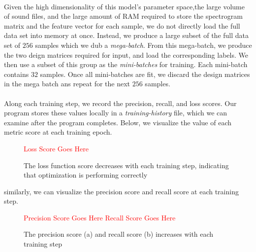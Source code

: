 \documentclass[12pt,letterpaper]{article}
\begin{document}
\paragraph*{}Given the high dimensionality of this model's parameter space,the large volume of sound files, and the large amount of RAM required to store the spectrogram matrix and the feature vector for each sample, we do not directly load the full data set into memory at once. Instead, we produce a large subset of the full data set of $256$ samples which we dub a \textit{mega-batch}. From this mega-batch, we produce the two deign matrices required for input, and load the corresponding labels. We then use a subset of this group as the \textit{mini-batches} for training. Each mini-batch contains $32$ samples. Once all mini-batches are fit, we discard the design matrices in the mega batch ans repeat for the next $256$ samples. 

\paragraph*{}Along each training step, we record the precision, recall, and loss scores. Our program stores these values locally in a \textit{training-history} file, which we can examine after the program completes. Below, we visualize the value of each metric score at each training epoch. 

\begin{figure}[h]
\begin{center}
\textcolor{red}{Loss Score Goes Here}
\end{center}
\caption{The loss function score decreases with each training step, indicating that optimization is performing correctly}
\label{fig-LossScore}
\end{figure}

similarly, we can visualize the precision score and recall score at each training step.

\begin{figure}[h]
\begin{center}
\textcolor{red}{Precision Score Goes Here}
\textcolor{red}{Recall Score Goes Here}
\end{center}
\caption{The precision score (a) and recall score (b) increases with each training step}
\label{fig-PrecisionRecallScores}
\end{figure}

\end{document}
